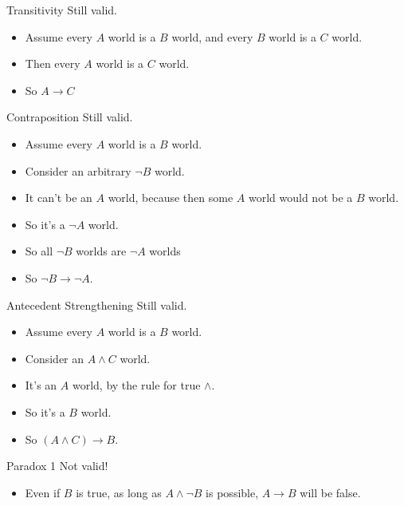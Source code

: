 \documentclass[
  ignorenonframetext,
]{beamer}
\providecommand{\tightlist}{%
  \setlength{\itemsep}{0pt}\setlength{\parskip}{0pt}}
\renewcommand{\,}{\text{, }}
\begin{document}
\begin{frame}{Transitivity}
\protect\hypertarget{transitivity}{}
Still valid.

\begin{itemize}
\tightlist
\item
  Assume every \(A\) world is a \(B\) world, and every \(B\) world is a
  \(C\) world.
\item
  Then every \(A\) world is a \(C\) world.
\item
  So \(A \rightarrow C\)
\end{itemize}
\end{frame}

\begin{frame}{Contraposition}
\protect\hypertarget{contraposition}{}
Still valid.

\begin{itemize}
\tightlist
\item
  Assume every \(A\) world is a \(B\) world.
\item
  Consider an arbitrary \(\neg B\) world.
\item
  It can't be an \(A\) world, because then some \(A\) world would not be
  a \(B\) world.
\item
  So it's a \(\neg A\) world.
\item
  So all \(\neg B\) worlds are \(\neg A\) worlds
\item
  So \(\neg B \rightarrow \neg A\).
\end{itemize}
\end{frame}

\begin{frame}{Antecedent Strengthening}
\protect\hypertarget{antecedent-strengthening}{}
Still valid.

\begin{itemize}
\tightlist
\item
  Assume every \(A\) world is a \(B\) world.
\item
  Consider an \(A \wedge C\) world.
\item
  It's an \(A\) world, by the rule for true \(\wedge\).
\item
  So it's a \(B\) world.
\item
  So \((A \wedge C) \rightarrow B\).
\end{itemize}
\end{frame}

\begin{frame}{Paradox 1}
\protect\hypertarget{paradox-1}{}
Not valid!

\begin{itemize}
\tightlist
\item
  Even if \(B\) is true, as long as \(A \wedge \neg B\) is possible,
  \(A \rightarrow B\) will be false.
\end{itemize}
\end{frame}
\end{document}

